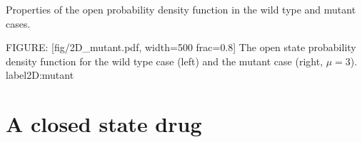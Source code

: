 {Properties of the open probability density function in the
wild type and mutant cases. %









FIGURE: [fig/2D_mutant.pdf, width=500 frac=0.8] The open state probability density function for the wild type case (left) and the mutant case (right, $\mu=3$).  label{2D:mutant}
\section{A closed state drug}

}
